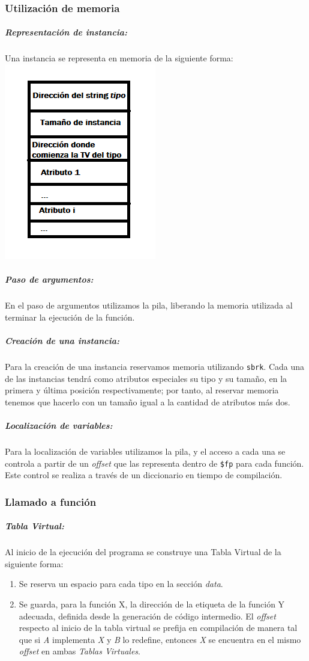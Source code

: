 \documentclass[a4paper,10pt,twocolumn]{article}
\begin{document}
\subsubsection{Utilización de memoria}

\subparagraph{Representación de instancia:}
	Una instancia se representa en memoria de la siguiente forma:
	\includegraphics[scale=0.7]{Instancia.png}

\subparagraph{Paso de argumentos:}
	 En el paso de argumentos utilizamos la pila, liberando la memoria utilizada al terminar la ejecución de la función. 
\subparagraph{Creación de una instancia:}
	Para la creación de una instancia reservamos memoria utilizando \lstinline|sbrk|. Cada una de las instancias tendrá como atributos especiales su tipo y su tamaño, en la primera y última posición respectivamente; por tanto, al reservar memoria tenemos que hacerlo con un tamaño igual a la cantidad de atributos más dos.

\subparagraph{Localización de variables:}
	Para la localización de variables utilizamos la pila, y el acceso a cada una se controla a partir de un \textit{offset} que las representa dentro de \lstinline|$fp| para cada función. Este control se realiza a través de un diccionario en tiempo de compilación. 
	
\subsubsection{Llamado a función}

\subparagraph{Tabla Virtual:}
Al inicio de la ejecución del programa se construye una Tabla Virtual de la siguiente forma:

\begin{enumerate}
	\item Se reserva un espacio para cada tipo en la sección \textit{data}. 
	\item Se guarda, para la función X, la dirección de la etiqueta de la función Y adecuada, definida desde la generación de código intermedio. El \textit{offset} respecto al inicio de la tabla virtual se prefija en compilación de manera tal que si \textit{A} implementa \textit{X} y \textit{B} lo redefine, entonces \textit{X} se encuentra en el mismo \textit{offset} en ambas \textit{Tablas Virtuales}.
\end{enumerate}
\end{document}
